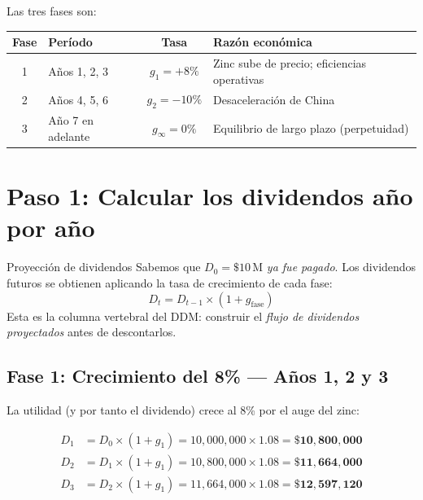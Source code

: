 \documentclass[12pt,a4paper]{article}
\begin{document}
\vspace{0.5cm}

\noindent Las tres fases son:

\begin{center}
\begin{tabular}{clcp{5.5cm}}
\toprule
\textbf{Fase} & \textbf{Per\'iodo} & \textbf{Tasa} & \textbf{Raz\'on econ\'omica} \\
\midrule
1 & A\~nos 1, 2, 3      & $g_1 = +8\%$       & Zinc sube de precio; eficiencias operativas \\
2 & A\~nos 4, 5, 6      & $g_2 = -10\%$      & Desaceleraci\'on de China \\
3 & A\~no 7 en adelante & $g_\infty = 0\%$   & Equilibrio de largo plazo (perpetuidad) \\
\bottomrule
\end{tabular}
\end{center}

\vspace{1cm}

\section{Paso 1: Calcular los dividendos a\~no por a\~no}

\begin{cajaintuicion}{Proyecci\'on de dividendos}
Sabemos que $D_0 = \$10\,\text{M}$ \emph{ya fue pagado}. Los dividendos futuros se obtienen
aplicando la tasa de crecimiento de cada fase:
\[
D_t = D_{t-1} \times (1 + g_{\text{fase}})
\]
Esta es la columna vertebral del DDM: construir el \emph{flujo de dividendos proyectados} antes
de descontarlos.
\end{cajaintuicion}

\subsection*{Fase 1: Crecimiento del 8\% --- A\~nos 1, 2 y 3}

La utilidad (y por tanto el dividendo) crece al 8\% por el auge del zinc:

\begin{align}
D_1 &= D_0 \times (1 + g_1) = 10{,}000{,}000 \times 1.08
    = \mathbf{\$10{,}800{,}000} \\[4pt]
D_2 &= D_1 \times (1 + g_1) = 10{,}800{,}000 \times 1.08
    = \mathbf{\$11{,}664{,}000} \\[4pt]
D_3 &= D_2 \times (1 + g_1) = 11{,}664{,}000 \times 1.08
    = \mathbf{\$12{,}597{,}120}
\end{align}
\end{document}
